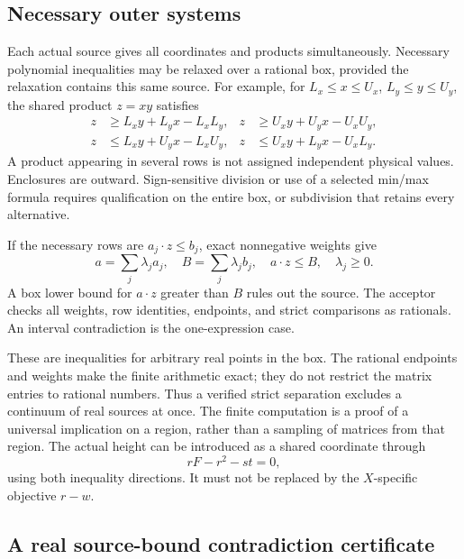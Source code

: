 \documentclass[11pt,reqno]{amsart}
\theoremstyle{definition}
\theoremstyle{remark}
\begin{document}
\subsection{Necessary outer systems}
Each actual source gives all coordinates and products simultaneously.
Necessary polynomial inequalities may be relaxed over a rational box,
provided the relaxation contains this same source. For example, for
\(L_x\le x\le U_x\), \(L_y\le y\le U_y\), the shared product \(z=xy\)
satisfies
\begin{align*}
z&\ge L_xy+L_yx-L_xL_y,&
z&\ge U_xy+U_yx-U_xU_y,\\
z&\le L_xy+U_yx-L_xU_y,&
z&\le U_xy+L_yx-U_xL_y.
\end{align*}
A product appearing in several rows is not assigned independent
physical values. Enclosures are outward. Sign-sensitive division or
use of a selected min/max formula requires qualification on the entire
box, or subdivision that retains every alternative.

If the necessary rows are \(a_j\cdot z\le b_j\), exact nonnegative
weights give
\[
a=\sum_j\lambda_ja_j,\quad
B=\sum_j\lambda_jb_j,\quad
a\cdot z\le B,\quad\lambda_j\ge0.
\]
A box lower bound for \(a\cdot z\) greater than \(B\) rules out the
source. The acceptor checks all weights, row identities, endpoints,
and strict comparisons as rationals.
An interval contradiction is the one-expression case.

These are inequalities for arbitrary real points in the box. The
rational endpoints and weights make the finite arithmetic exact; they
do not restrict the matrix entries to rational numbers. Thus a verified
strict separation excludes a continuum of real sources at once. The finite
computation is a proof of a universal implication on a region, rather
than a sampling of matrices from that region.
The actual height can be introduced as a shared coordinate through
\[
rF-r^2-st=0,
\]
using both inequality directions. It must not be replaced by the
\(X\)-specific objective \(r-w\).

\subsection{A real source-bound contradiction certificate}
\label{certificate:worked}
\end{document}
